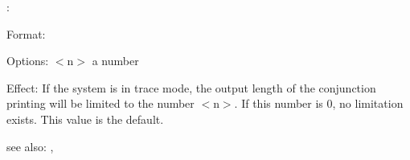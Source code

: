 \showdepth:

Format: 

Options: $<$n$>$ a number

Effect: If the system is in trace mode, the output length of the
        conjunction printing will be limited to the number $<$n$>$.
	If this number is 0, no limitation exists. This value is the
	default.

see also: \spy, \nospy
